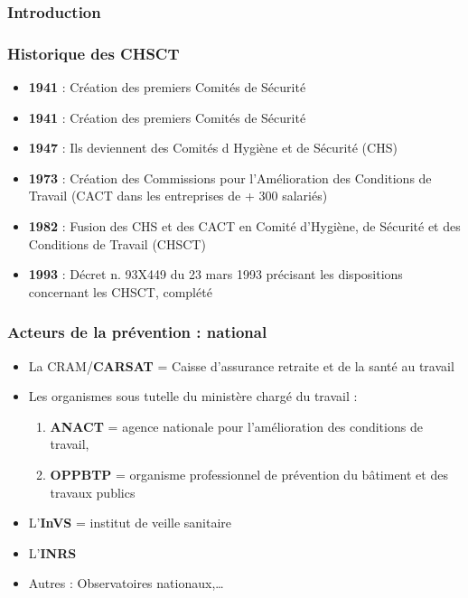 \documentclass{beamer}
\begin{document}

\begin{frame}
\frametitle{Introduction}
\end{frame} 



\begin{frame}
\frametitle{Historique des CHSCT}
\begin{itemize}
\item \textbf{1941} : Création des premiers Comités de Sécurité 

\item \textbf{1941} : Création des premiers Comités de Sécurité 

\item \textbf{1947} : Ils deviennent des Comités d Hygiène et de Sécurité (CHS)

\item \textbf{1973} : Création des Commissions pour l'Amélioration des Conditions  de Travail (CACT dans les entreprises de + 300 salariés)

\item \textbf{1982} : Fusion des CHS et des CACT en Comité d'Hygiène, de Sécurité et des Conditions de Travail (CHSCT) 

\item \textbf{1993} : Décret n. 93X449 du 23 mars 1993 précisant les dispositions concernant les CHSCT, complété
\end{itemize}
\end{frame} 

\begin{frame}
\frametitle{Acteurs de la prévention : national}

\begin{itemize}
\item La CRAM/\textbf{CARSAT} = Caisse d'assurance retraite et de la santé au travail 

\item Les organismes sous tutelle du ministère chargé du travail : 
\begin{enumerate}
        \item \textbf{ANACT} = agence nationale pour l’amélioration des conditions de travail,
        \item \textbf{OPPBTP} = organisme professionnel de prévention du bâtiment et des travaux publics
\end{enumerate}

\item L’\textbf{InVS} = institut de veille sanitaire

\item L’\textbf{INRS} 

\item Autres : Observatoires nationaux,…
\end{itemize}
\end{frame} 
\end{document}
